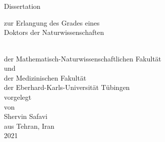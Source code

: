 \begin{titlepage}
  \begin{addmargin}[-1cm]{-3cm}

    \begin{center}

      \vspace{9.5pt}

      \begingroup
      {\LARGE{\color{black}{\myTitle}}} \\ [5pt]%
      \emph{\Large \mySubtitle} \\[4cm]%
      \endgroup

      \vspace{7.5pt}


      \begin{minipage}{0.8\textwidth}

        \begin{center}

          \Large Dissertation\\

          \vspace{7.5pt}

          zur Erlangung des Grades eines\\

          Doktors der Naturwissenschaften\\

        \end{center}

      \end{minipage}
      \\[2cm]




      {\Large der Mathematisch-Naturwissenschaftlichen Fakult\"at\\

        und\\

        der Medizinischen Fakult\"at\\[5pt]

        der Eberhard-Karls-Universit\"at T\"ubingen}
      \\[3cm]


      {\Large vorgelegt\\

        von\\[1cm]

        Shervin Safavi \\[5pt]

        aus Tehran, Iran}
      \\[1.6cm]

      {\Large 2021}


    \end{center} 
  \end{addmargin}
\end{titlepage}



